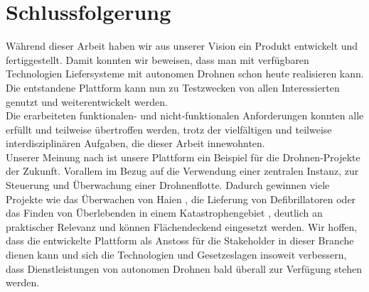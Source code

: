\section{Schlussfolgerung}

Während dieser Arbeit haben wir aus unserer Vision ein Produkt entwickelt und fertiggestellt. Damit konnten wir beweisen, dass man mit verfügbaren Technologien Liefersysteme mit autonomen Drohnen schon heute realisieren kann. Die entstandene Plattform kann nun zu Testzwecken von allen Interessierten genutzt und weiterentwickelt werden.\\

Die erarbeiteten funktionalen- und nicht-funktionalen Anforderungen konnten alle erfüllt und teilweise übertroffen werden, trotz der vielfältigen und teilweise interdisziplinären Aufgaben, die dieser Arbeit innewohnten. \\

Unserer Meinung nach ist unsere Plattform ein Beispiel für die Drohnen-Projekte der Zukunft. Vorallem im Bezug auf die Verwendung einer zentralen Instanz, zur Steuerung und Überwachung einer Drohnenflotte. Dadurch gewinnen viele Projekte wie das Überwachen von Haien \cite{shark}, die Lieferung von Defibrillatoren \cite{defibrillator-drone} oder das Finden von Überlebenden in einem Katastrophengebiet \cite{catastrophic-drone}, deutlich an praktischer Relevanz und können Flächendeckend eingesetzt werden. Wir hoffen, dass die entwickelte Plattform als Anstoss für die Stakeholder in dieser Branche dienen kann und sich die Technologien und Gesetzeslagen insoweit verbessern, dass Dienstleistungen von autonomen Drohnen bald überall zur Verfügung stehen werden.





